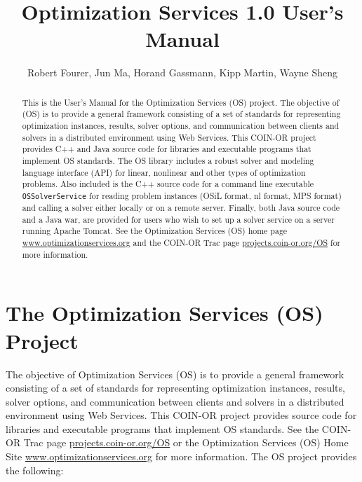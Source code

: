 \documentclass[11pt]{article}
\renewcommand{\_}{{\char"5F}}
\renewcommand{\{}{{\char"7B}}
\renewcommand{\}}{{\char"7D}}
\renewcommand{\^}{{\char"0D}}
\renewcommand{\'}{{\char"0D}}
\begin{document}
\title{Optimization Services 1.0 User's Manual }
\vskip 2in
\author{Robert Fourer, Jun Ma,  Horand Gassmann, Kipp Martin, Wayne Sheng}
\maketitle

\begin{abstract}
This is the User's Manual for the Optimization Services (OS) project.  The objective of  (OS) is to provide a general framework consisting of a set of standards for representing optimization instances, results, solver options, and communication between clients and solvers in a distributed environment using Web Services. This COIN-OR project provides C++ and Java source code for libraries and executable programs that implement OS standards.   The OS library includes a robust solver and modeling language interface (API) for linear, nonlinear and other types of optimization problems.   Also included is the C++ source code for a  command line executable {\tt OSSolverService}  for reading problem instances (OSiL format, nl format, MPS format) and calling a solver either locally or on a remote server.  Finally,  both Java source code and a Java war, are provided for users who wish to set up a solver service on a server running Apache Tomcat.   See the Optimization Services (OS) home page \url{www.optimizationservices.org} and the COIN-OR Trac page \url{projects.coin-or.org/OS} for more information.
\end{abstract}


\newpage
\tableofcontents
\listoffigures
\listoftables
{}



\newpage

\section{The Optimization Services (OS) Project}

The objective of Optimization Services (OS) is to provide a general framework consisting of a set of standards for representing optimization instances, results, solver options, and communication between clients and solvers in a distributed environment using Web Services. This COIN-OR project provides source code for libraries and executable programs that implement OS standards.  See the COIN-OR Trac page \url{projects.coin-or.org/OS} or the Optimization Services (OS) Home Site \url{www.optimizationservices.org}   for more information. The OS project provides the following:
\end{document}
